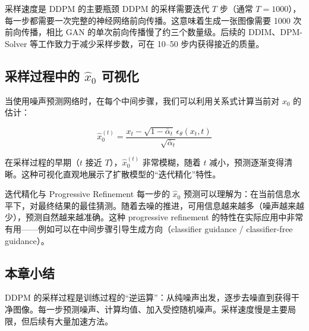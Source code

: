 \begin{warningbox}{采样速度是 DDPM 的主要瓶颈}
DDPM 的采样需要迭代 $T$ 步（通常 $T = 1000$），每一步都需要一次完整的神经网络前向传播。这意味着生成一张图像需要 1000 次前向传播，相比 GAN 的单次前向传播慢了约三个数量级。后续的 DDIM、DPM-Solver 等工作致力于减少采样步数，可在 10--50 步内获得接近的质量。
\end{warningbox}

\subsection{采样过程中的 $\hat{x}_0$ 可视化}

当使用噪声预测网络时，在每个中间步骤，我们可以利用关系式计算当前对 $x_0$ 的估计：

$$\hat{x}_0^{(t)} = \frac{x_t - \sqrt{1-\bar{\alpha}_t}\, \epsilon_\theta(x_t, t)}{\sqrt{\bar{\alpha}_t}}$$

在采样过程的早期（$t$ 接近 $T$），$\hat{x}_0^{(t)}$ 非常模糊，随着 $t$ 减小，预测逐渐变得清晰。这种可视化直观地展示了扩散模型的``迭代精化''特性。

\begin{knowledgebox}{迭代精化与 Progressive Refinement}
每一步的 $\hat{x}_0$ 预测可以理解为：在当前信息水平下，对最终结果的最佳猜测。随着去噪的推进，可用信息越来越多（噪声越来越少），预测自然越来越准确。这种 progressive refinement 的特性在实际应用中非常有用——例如可以在中间步骤引导生成方向（classifier guidance / classifier-free guidance）。
\end{knowledgebox}

\subsection{本章小结}

DDPM 的采样过程是训练过程的``逆运算''：从纯噪声出发，逐步去噪直到获得干净图像。每一步预测噪声、计算均值、加入受控随机噪声。采样速度慢是主要局限，但后续有大量加速方法。



